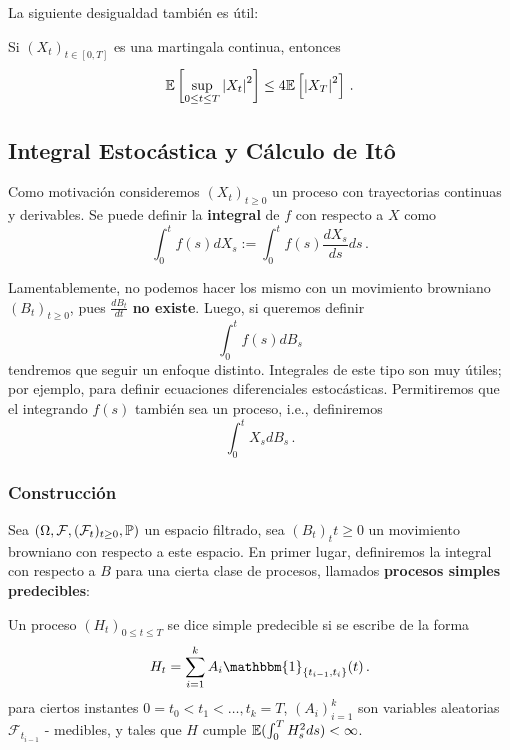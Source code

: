\newp La siguiente desigualdad también es útil:
\begin{theorem}
Si $(X_t)_{t \in [0,T]}$ es una martingala continua, entonces 
\begin{equation*}
    \E \left[ \sup_{0 \le  t \le  T} \abs{X_t}^2 \right] \le 4 \E \left[ \abs{X_T}^2 \right]\,.
\end{equation*}
\end{theorem}

\subsection{Integral Estocástica y Cálculo de It\^{o}}
Como motivación consideremos $(X_t)_{t \ge 0}$ un proceso con trayectorias continuas y derivables. Se puede definir la \textbf{integral} de $f$ con respecto a $X$ como
\begin{equation*}
        \int_{0}^{t} f(s) dX_s := \int_{0}^{t} f(s) \frac{dX_s}{ds} ds \,.
\end{equation*}

Lamentablemente, no podemos hacer los mismo con un movimiento browniano $(B_t)_{t \ge 0}$, pues $\displaystyle\frac{dB_t}{dt}$ \textbf{no existe}. Luego, si queremos definir 
\begin{equation*}
        \int_{0}^{t} f(s) dB_s
\end{equation*}
tendremos que seguir un enfoque distinto. Integrales de este tipo son muy útiles; por ejemplo, para definir ecuaciones diferenciales estocásticas. 
\newp Permitiremos que el integrando $f(s)$ también sea un proceso, i.e., definiremos 
$$\int_{0}^{t} X_s dB_s \,.$$ 

\subsubsection{Construcción}
Sea $(\Omega, \mathcal{F}, (\mathcal{F}_t)_{t \geq 0}, \P)$ un espacio filtrado, sea $(B_t)_t{t \ge 0}$ un movimiento browniano con respecto a este espacio. En primer lugar, definiremos la integral con respecto a $B$ para una cierta clase de procesos, llamados \textbf{procesos simples predecibles}:
\begin{definition}
Un proceso $(H_t)_{0 \le  t \le T}$ se dice simple predecible si se escribe de la forma 
\begin{equation*}
    H_t = \sum_{i=1}^{k} A_i \mathbbm{1}_{\{ t_{i-1}, t_i \}} (t)\,.
\end{equation*}
para ciertos instantes $0 = t_0 < t_1 < \ldots, t_k = T$, $(A_i)_{i=1}^{k}$ son variables aleatorias $\mathcal{F}_{t_{i -1}}$ - medibles, y tales que $H$ cumple $\E(\int_{0}^{T} H_s^{2} ds) < \infty$.
\end{definition}

